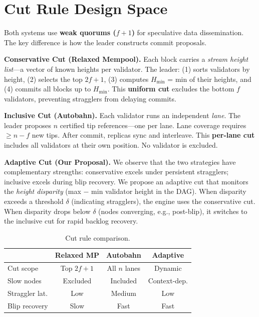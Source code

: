 \documentclass[sigconf,10pt,nonacm]{acmart}
\begin{document}
\vspace{-0.5em}
\section{Cut Rule Design Space}
\vspace{-0.3em}

Both systems use \textbf{weak quorums ($f{+}1$)} for speculative data dissemination. The key difference is how the leader constructs commit proposals.

\vspace{0.2em}
\noindent\textbf{Conservative Cut (Relaxed Mempool).} Each block carries a \emph{stream height list}---a vector of known heights per validator. The leader: (1) sorts validators by height, (2) selects the top $2f{+}1$, (3) computes $H_{\min}$ = min of their heights, and (4) commits all blocks up to $H_{\min}$. This \textbf{uniform cut} excludes the bottom $f$ validators, preventing stragglers from delaying commits.

\vspace{0.2em}
\noindent\textbf{Inclusive Cut (Autobahn).} Each validator runs an independent \emph{lane}. The leader proposes $n$ certified tip references---one per lane. Lane coverage requires ${\geq}n{-}f$ new tips. After commit, replicas sync and interleave. This \textbf{per-lane cut} includes all validators at their own position. No validator is excluded.

\vspace{0.2em}
\noindent\textbf{Adaptive Cut (Our Proposal).} We observe that the two strategies have complementary strengths: conservative excels under persistent stragglers; inclusive excels during blip recovery. We propose an adaptive cut that monitors the \emph{height disparity} (max $-$ min validator height in the DAG). When disparity exceeds a threshold $\delta$ (indicating stragglers), the engine uses the conservative cut. When disparity drops below $\delta$ (nodes converging, e.g., post-blip), it switches to the inclusive cut for rapid backlog recovery.

\vspace{-0.2em}
\begin{table}[h]
\centering
\small
\vspace{-0.5em}
\caption{Cut rule comparison.}
\vspace{-0.5em}
\label{tab:cmp}
\begin{tabular}{@{}lccc@{}}
\toprule
& \textbf{Relaxed MP} & \textbf{Autobahn} & \textbf{Adaptive} \\
\midrule
Cut scope        & Top $2f{+}1$       & All $n$ lanes & Dynamic \\
Slow nodes       & Excluded           & Included      & Context-dep. \\
Straggler lat.   & Low                & Medium        & Low \\
Blip recovery    & Slow               & Fast          & Fast \\
\bottomrule
\end{tabular}
\vspace{-1em}
\end{table}
\end{document}
